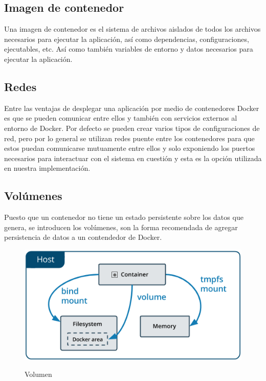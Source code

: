 \subsection{Imagen de contenedor}

Una imagen de contenedor es el sistema de archivos aislados de todos los archivos necesarios para
ejecutar la aplicación, así como dependencias, configuraciones, ejecutables, etc. Así como también
variables de entorno y datos necesarios para ejecutar la aplicación. \cite{Docker}

\subsection{Redes}

Entre las ventajas de desplegar una aplicación por medio de contenedores Docker es que se pueden
comunicar entre ellos y también con servicios externos al entorno de Docker. Por defecto se pueden
crear varios tipos de configuraciones de red, pero por lo general se utilizan redes puente entre
los contenedores para que estos puedan comunicarse mutuamente entre ellos y solo exponiendo los
puertos necesarios para interactuar con el sistema en cuestión y esta es la opción utilizada en
nuestra implementación. \cite{Docker}

\subsection{Volúmenes}
Puesto que un contenedor no tiene un estado persistente sobre los datos que genera, se introducen
los volúmenes, son la forma recomendada de agregar persistencia de datos a un contendedor de
Docker.
\cite{Docker}

\begin{figure}[ht]
	\centering
	\includegraphics[width=\textwidth]{imagenes/cap4/docker-volume.png}
	\caption{Volumen}
	\cite{Docker}
	\label{fig:volume_diagram}
\end{figure}

